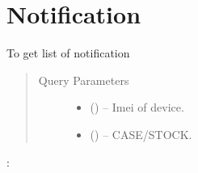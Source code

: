 \documentclass[letterpaper,10pt,english,openany,oneside]{sphinxmanual}
\begin{document}
\section{Notification}
\label{\detokenize{api-cmi/v1:notification}}

\begin{fulllineitems}
\label{\detokenize{api-cmi/v1:get--api-malaria-info-v1-Notification-get_list}}
\sphinxAtStartPar
To get list of notification
\begin{quote}\begin{description}
\item[{Query Parameters}] \leavevmode\begin{itemize}
\item {} 
\sphinxAtStartPar
{} () – Imei of device.

\item {} 
\sphinxAtStartPar
{} () – CASE/STOCK.

\end{itemize}

\end{description}\end{quote}

\sphinxAtStartPar
{}:


\end{fulllineitems}
\end{document}
